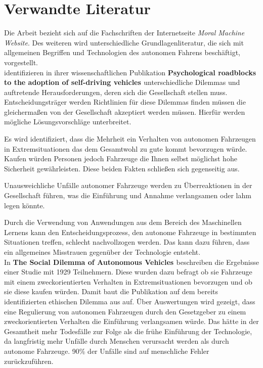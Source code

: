 \section{Verwandte Literatur}
\label{sec:verwandte-literatur}

Die Arbeit bezieht sich auf die Fachschriften der Internetseite \textit{Moral Machine Website}. Des weiteren wird unterschiedliche Grundlagenliteratur, die sich mit allgemeinen Begriffen und Technologien des autonomen Fahrens beschäftigt, vorgestellt.\\

\citeauthor{roadblocks} identifizieren in ihrer wissenschaftlichen Publikation \textbf{Psychological roadblocks to the adoption of self-driving vehicles \cite{roadblocks}} unterschiedliche Dilemmas und auftretende Herausforderungen, deren sich die Gesellschaft stellen muss. Entscheidungsträger werden Richtlinien für diese Dilemmas finden müssen die gleichermaßen von der Gesellschaft akzeptiert werden müssen. Hierfür werden mögliche Lösungsvorschläge unterbreitet. 

Es wird identifiziert, dass die Mehrheit ein Verhalten von autonomen Fahrzeugen in Extremsituationen das dem Gesamtwohl zu gute kommt bevorzugen würde. Kaufen würden Personen jedoch Fahrzeuge die Ihnen selbst möglichst hohe Sicherheit gewährleisten. Diese beiden Fakten schließen sich gegenseitig aus.

Unausweichliche Unfälle autonomer Fahrzeuge werden zu Überreaktionen in der Gesellschaft führen, was die Einführung und Annahme verlangsamen oder lahm legen könnte.

Durch die Verwendung von Anwendungen aus dem Bereich des Maschinellen Lernens kann den Entscheidungsprozess, den autonome Fahrzeuge in bestimmten Situationen treffen, schlecht nachvollzogen werden. Das kann dazu führen, dass ein allgemeines Misstrauen gegenüber der Technologie entsteht.\\

In \textbf{The Social Dilemma of Autonomous Vehicles \cite{socialDilemma}} beschreiben \citeauthor{socialDilemma} die Ergebnisse einer Studie mit 1929 Teilnehmern. Diese wurden dazu befragt ob sie Fahrzeuge mit einem zweckorientierten Verhalten in Extremsituationen bevorzugen und ob sie diese kaufen würden. Damit baut die Publikation auf dem bereits identifizierten ethischen Dilemma aus \cite{roadblocks} auf. Über Auswertungen wird gezeigt, dass eine Regulierung von autonomen Fahrzeugen durch den Gesetzgeber zu einem zweckorientierten Verhalten die Einführung verlangsamen würde. Das hätte in der Gesamtheit mehr Todesfälle zur Folge als die frühe Einführung der Technologie, da langfristig mehr Unfälle durch Menschen verursacht werden als durch autonome Fahrzeuge. 90\% der Unfälle sind auf menschliche Fehler zurückzuführen.\\


